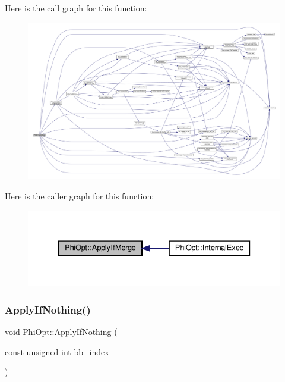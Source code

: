 Here is the call graph for this function\+:
\nopagebreak
\begin{figure}[H]
\begin{center}
\leavevmode
\includegraphics[width=350pt]{dc/ddf/classPhiOpt_a3ad16335886d4b4ef6f00b7d4d087ff5_cgraph}
\end{center}
\end{figure}
Here is the caller graph for this function\+:
\nopagebreak
\begin{figure}[H]
\begin{center}
\leavevmode
\includegraphics[width=333pt]{dc/ddf/classPhiOpt_a3ad16335886d4b4ef6f00b7d4d087ff5_icgraph}
\end{center}
\end{figure}
\mbox{\label{classPhiOpt_af2d1a2083c7f247ec714dfc73ee38de0}} 
\subsubsection{\texorpdfstring{Apply\+If\+Nothing()}{ApplyIfNothing()}}
{\footnotesize\ttfamily void Phi\+Opt\+::\+Apply\+If\+Nothing (\begin{DoxyParamCaption}\item[{const unsigned int}]{bb\+\_\+index }\end{DoxyParamCaption})\hspace{0.3cm}{\ttfamily [private]}}



